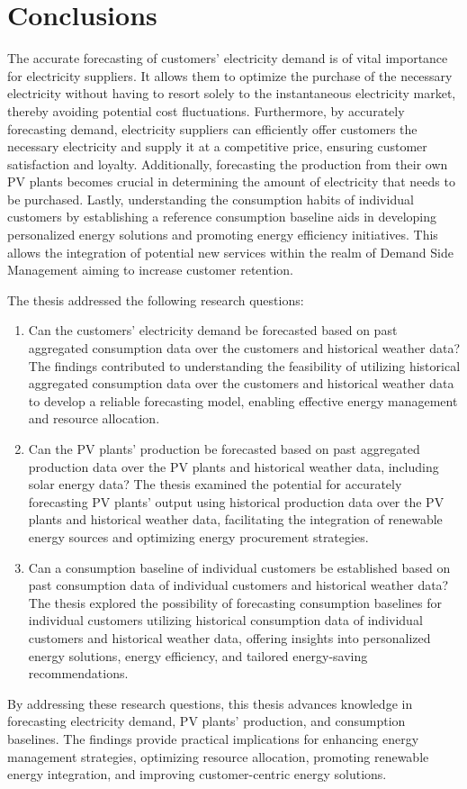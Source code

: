 \chapter{Conclusions}
\label{cha:conclusions}
\vspace{0.4 cm}

The accurate forecasting of customers' electricity demand is of vital importance for electricity suppliers.
It allows them to optimize the purchase of the necessary electricity without having to resort solely to the instantaneous electricity market, thereby avoiding potential cost fluctuations.
Furthermore, by accurately forecasting demand, electricity suppliers can efficiently offer customers the necessary electricity and supply it at a competitive price, ensuring customer satisfaction and loyalty.
Additionally, forecasting the production from their own PV plants becomes crucial in determining the amount of electricity that needs to be purchased.
Lastly, understanding the consumption habits of individual customers by establishing a reference consumption baseline aids in developing personalized energy solutions and promoting energy efficiency initiatives.
This allows the integration of potential new services within the realm of Demand Side Management aiming to increase customer retention.

The thesis addressed the following research questions:
\begin{enumerate}
  \item Can the customers' electricity demand be forecasted based on past aggregated consumption data over the customers and historical weather data? The findings contributed to understanding the feasibility of utilizing historical aggregated consumption data over the customers and historical weather data to develop a reliable forecasting model, enabling effective energy management and resource allocation.
  \item Can the PV plants' production be forecasted based on past aggregated production data over the PV plants and historical weather data, including solar energy data? The thesis examined the potential for accurately forecasting PV plants' output using historical production data over the PV plants and historical weather data, facilitating the integration of renewable energy sources and optimizing energy procurement strategies.
  \item Can a consumption baseline of individual customers be established based on past consumption data of individual customers and historical weather data? The thesis explored the possibility of forecasting consumption baselines for individual customers utilizing historical consumption data of individual customers and historical weather data, offering insights into personalized energy solutions, energy efficiency, and tailored energy-saving recommendations.
\end{enumerate}
By addressing these research questions, this thesis advances knowledge in forecasting electricity demand, PV plants' production, and consumption baselines.
The findings provide practical implications for enhancing energy management strategies, optimizing resource allocation, promoting renewable energy integration, and improving customer-centric energy solutions.

